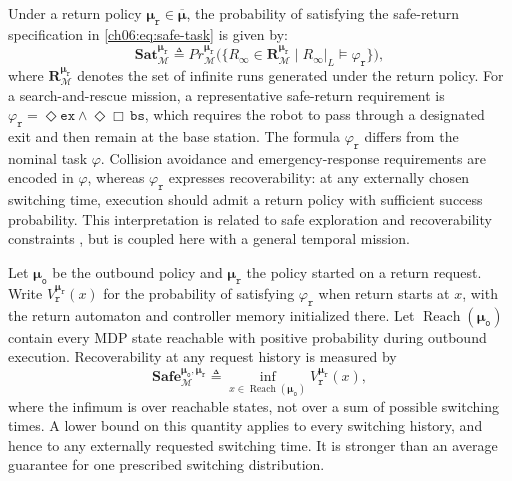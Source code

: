 Under a return policy
$\boldsymbol{\mu}_{\texttt{r}} \in \overline{\boldsymbol{\mu}}$, the
probability of satisfying the safe-return specification in
\eqref{ch06:eq:safe-task} is given by:
\begin{equation}
\label{ch06:eq:sat-return}
\textbf{Sat}_{\mathcal{M}}^{\boldsymbol{\mu}_{\texttt{r}}} \triangleq
Pr_{\mathcal{M}}^{\boldsymbol{\mu}_{\texttt{r}}}
\bigl(
\{R_{\infty} \in \mathbf{R}_{\mathcal{M}}^{\boldsymbol{\mu}_{\texttt{r}}}
\mid R_{\infty}|_{L} \models \varphi_{\texttt{r}}\}
\bigr),
\end{equation}
where $\mathbf{R}_{\mathcal{M}}^{\boldsymbol{\mu}_{\texttt{r}}}$ denotes the
set of infinite runs generated under the return policy.
For a search-and-rescue mission, a representative safe-return requirement is
$\varphi_{\texttt{r}} = \Diamond \texttt{ex} \wedge
\Diamond \Box \,\texttt{bs}$, which requires the robot to pass through a
designated exit and then remain at the base station.
The formula $\varphi_{\texttt{r}}$ differs from the nominal task $\varphi$.
Collision avoidance and emergency-response requirements are encoded in
$\varphi$, whereas $\varphi_{\texttt{r}}$ expresses recoverability: at any
externally chosen switching time, execution should admit a return policy with
sufficient success probability. This interpretation is related to safe
exploration and recoverability constraints
\citep{moldovan2012safe,turchetta2016safe}, but is coupled here with a general
temporal mission.
\begin{revision}
Let $\boldsymbol\mu_{\texttt o}$ be the outbound policy and
$\boldsymbol\mu_{\texttt r}$ the policy started on a return request.
Write $V_{\texttt r}^{\boldsymbol\mu_{\texttt r}}(x)$ for the probability
of satisfying $\varphi_{\texttt r}$ when return starts at $x$, with the
return automaton and controller memory initialized there.
Let $\operatorname{Reach}(\boldsymbol\mu_{\texttt o})$ contain every MDP
state reachable with positive probability during outbound execution.
Recoverability at any request history is measured by
\begin{equation}
\label{ch06:eq:sat-return-new}
\textbf{Safe}_{\mathcal M}^{\boldsymbol\mu_{\texttt o},
\boldsymbol\mu_{\texttt r}}
\triangleq\inf_{x\in\operatorname{Reach}(\boldsymbol\mu_{\texttt o})}
V_{\texttt r}^{\boldsymbol\mu_{\texttt r}}(x),
\end{equation}
where the infimum is over reachable states, not over a sum of possible
switching times. A lower bound on this quantity applies to every switching
history, and hence to any externally requested switching time. It is stronger
than an average guarantee for one prescribed switching distribution.
\end{revision}

